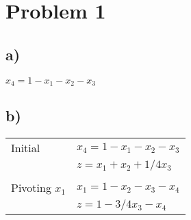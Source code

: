 \documentclass[12pt,a4paper]{article}
\author{Jens Egholm Pedersen}
\begin{document}
\section*{Problem 1}

\subsection*{a)}
$x_4 = 1 - x_1 - x_2 - x_3 $
\subsection*{b)}
\begin{tabular}{l l}
Initial & $x_4 = 1 - x_1 - x_2 - x_3 $ \\
		& $z = x_1 + x_2 + 1/4x_3$ \\ \\
Pivoting $x_1$ & $x_1 = 1 - x_2 - x_3 - x_4 $ \\
 		& $z = 1 - 3/4x_3 - x_4$
\end{tabular}
\end{document}
